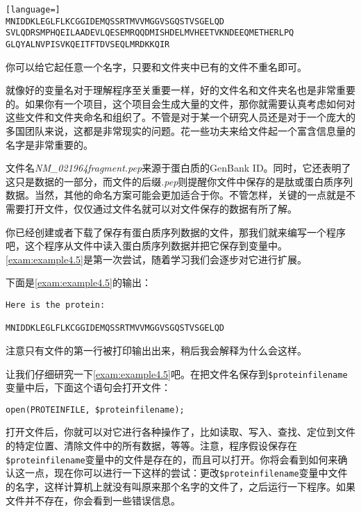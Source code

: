 \begin{lstlisting}[language=]
MNIDDKLEGLFLKCGGIDEMQSSRTMVVMGGVSGQSTVSGELQD
SVLQDRSMPHQEILAADEVLQESEMRQQDMISHDELMVHEETVKNDEEQMETHERLPQ
GLQYALNVPISVKQEITFTDVSEQLMRDKKQIR
\end{lstlisting}

你可以给它起任意一个名字，只要和文件夹中已有的文件不重名即可。

就像好的变量名对于理解程序至关重要一样，好的文件名和文件夹名也是非常重要的。如果你有一个项目，这个项目会生成大量的文件，那你就需要认真考虑如何对这些文件和文件夹命名和组织了。不管是对于某一个研究人员还是对于一个庞大的多国团队来说，这都是非常现实的问题。花一些功夫来给文件起一个富含信息量的名字是非常重要的。

文件名\textit{NM\_021964fragment.pep}来源于蛋白质的GenBank
ID。同时，它还表明了这只是数据的一部分，而文件的后缀\textit{.pep}则提醒你文件中保存的是肽或蛋白质序列数据。当然，其他的命名方案可能会更加适合于你。不管怎样，关键的一点就是不需要打开文件，仅仅通过文件名就可以对文件保存的数据有所了解。

你已经创建或者下载了保存有蛋白质序列数据的文件，那我们就来编写一个程序吧，这个程序从文件中读入蛋白质序列数据并把它保存到变量中。\autoref{exam:example4.5}是第一次尝试，随着学习我们会逐步对它进行扩展。



下面是\autoref{exam:example4.5}的输出：

\begin{lstlisting}
Here is the protein:

MNIDDKLEGLFLKCGGIDEMQSSRTMVVMGGVSGQSTVSGELQD
\end{lstlisting}

注意只有文件的第一行被打印输出出来，稍后我会解释为什么会这样。

让我们仔细研究一下\autoref{exam:example4.5}吧。在把文件名保存到\verb|$proteinfilename|变量中后，下面这个语句会打开文件：

\begin{lstlisting}
open(PROTEINFILE, $proteinfilename);
\end{lstlisting}

打开文件后，你就可以对它进行各种操作了，比如读取、写入、查找、定位到文件的特定位置、清除文件中的所有数据，等等。注意，程序假设保存在\verb|$proteinfilename|变量中的文件是存在的，而且可以打开。你将会看到如何来确认这一点，现在你可以进行一下这样的尝试：更改\verb|$proteinfilename|变量中文件的名字，这样计算机上就没有叫原来那个名字的文件了，之后运行一下程序。如果文件并不存在，你会看到一些错误信息。

